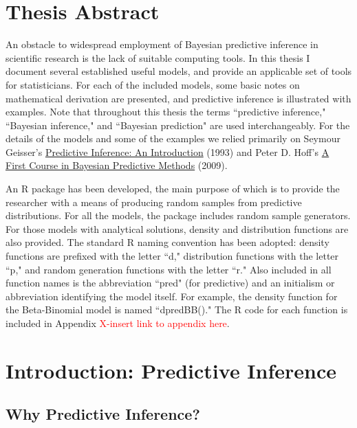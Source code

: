\documentclass[12pt, a4paper]{article}
\begin{document}




\tableofcontents
\newpage


\section{Thesis Abstract}

An obstacle to widespread employment of Bayesian predictive inference in scientific research is the lack of suitable computing tools.  In this thesis I document several established useful models, and provide an applicable set of tools for statisticians.  For each of the included models, some basic notes on mathematical derivation are presented, and predictive inference is illustrated with examples.  Note that throughout this thesis the terms ``predictive inference," ``Bayesian inference," and ``Bayesian prediction" are used interchangeably.  For the details of the models and some of the examples we relied primarily on Seymour Geisser's \underline{Predictive Inference:  An Introduction} (1993) and Peter D. Hoff's \underline{A First Course in Bayesian Predictive Methods} (2009).

    An R package has been developed, the main purpose of which is to provide the researcher with a means of producing random samples from predictive distributions.  For all the models, the package includes random sample generators.  For those models with analytical solutions, density and distribution functions are also provided.  The standard R naming convention has been adopted:  density functions are prefixed with the letter ``d," distribution functions with the letter ``p," and random generation functions with the letter ``r."  Also included in all function names is the abbreviation ``pred" (for predictive) and an initialism or abbreviation identifying the model itself.  For example, the density function for the Beta-Binomial model is named ``dpredBB()."  The R code for each function is included in Appendix \textcolor{red}{X-insert link to appendix here}.




\section{Introduction:  Predictive Inference}

  \subsection{Why Predictive Inference?}
\end{document}
